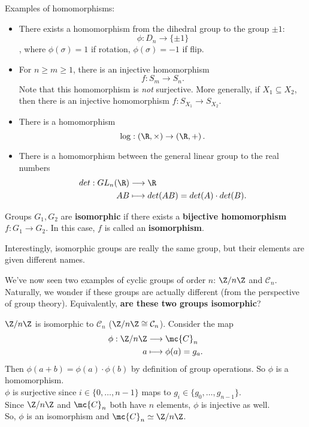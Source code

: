 \documentclass[math1530-lecture-notes]{subfiles}
\begin{document}
\begin{example}
  Examples of homomorphisms:
  \begin{itemize}
    \item There exists a homomorphism from the dihedral group to the group $\pm 1$:  \[
        \phi: D_n \to \{ \pm 1 \}
      \], where $\phi(\sigma) = 1$ if rotation, $ \phi(\sigma)=-1$ if flip.
    \item For $n\ge m\ge 1$, there is an injective homomorphism \[
        f:S_m \to S_n
      .\] Note that this homomorphism is \textit{not} surjective. More generally, if $X_1\subseteq
      X_2$, then there is an injective homomorphism $f:S_{X_1} \to S_{X_2}$.
    \item There is a homomorphism \[
          \log: \left( \R,\times  \right) \to \left( \R,+ \right) 
      .\] 
    \item There is a homomorphism between the general linear group to the real numbers \begin{align*}
        det: GL_n(\R) &\longrightarrow \R \\
        AB &\longmapsto det(AB) = det(A)\cdot det(B)
    .\end{align*}
  \end{itemize}
\end{example}

\begin{definition}[Isomorphisms]{}
  Groups $  G_1,G_2$ are \textbf{isomorphic} if there exists a \textbf{bijective homomorphism} $f:
  G_1\to G_2$. In this case, $f$ is called an \textbf{isomorphism}.
\end{definition}
Interestingly, isomorphic groups are really the same group, but their elements are given different
names.


We've now seen two examples of cyclic groups of order $n $: $\Z/n\Z$ and $\mathcal{C}_n$. Naturally,
we wonder if these groups are actually different (from the perspective of group theory).
Equivalently,  \textbf{are these two groups isomorphic}?
\begin{example}
  $\Z / n\Z$ is isomorphic to $\mathcal{C}_n$ ($ \Z / n\Z\cong \mathcal{C}_n$). Consider the map
  \begin{align*}
    \phi: \Z / n\Z &\longrightarrow \mc{C}_n \\
    a &\longmapsto \phi(a) = g_a
  .\end{align*} Then $\phi(a+b)=\phi(a)\cdot \phi(b)$ by definition of group operations. So $\phi$ 
  is a homomorphism.\\
  $\phi$ is surjective since $i\in \{ 0,\ldots,n-1 \}$ maps to $g_i\in \{ g_0,\ldots,g_{n-1} \}$.
  \\Since $\Z / n\Z $ and $\mc{C}_n$ both have  $n$ elements, $\phi$ is injective as well. \\
  So, $\phi$ is an isomorphism and $\mc{C}_n \simeq \Z / n\Z$.
\end{example}
\end{document}
